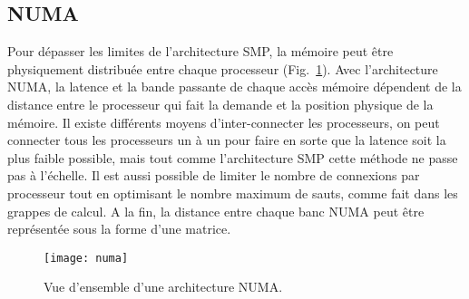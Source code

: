 \subsection{NUMA}
Pour dépasser les limites de l'architecture SMP, la mémoire peut être physiquement distribuée entre chaque processeur (Fig.~\ref{fig:numa}).
%
Avec l'architecture NUMA, la latence et la bande passante de chaque accès mémoire dépendent de la distance entre le processeur qui fait la demande et la position physique de la mémoire.
%
Il existe différents moyens d'inter-connecter les processeurs, on peut connecter tous les processeurs un à un pour faire en sorte que la latence soit la plus faible possible, mais tout comme l'architecture SMP cette méthode ne passe pas à l'échelle.
%
Il est aussi possible de limiter le nombre de connexions par processeur tout en optimisant le nombre maximum de sauts, comme fait dans les grappes de calcul.
%
A la fin, la distance entre chaque banc NUMA peut être représentée sous la forme d'une matrice.

\begin{figure}[!ht]
  \centering
  \texttt{[image: numa]}
  \caption{Vue d'ensemble d'une architecture NUMA.}
  \label{fig:numa}
\end{figure}
